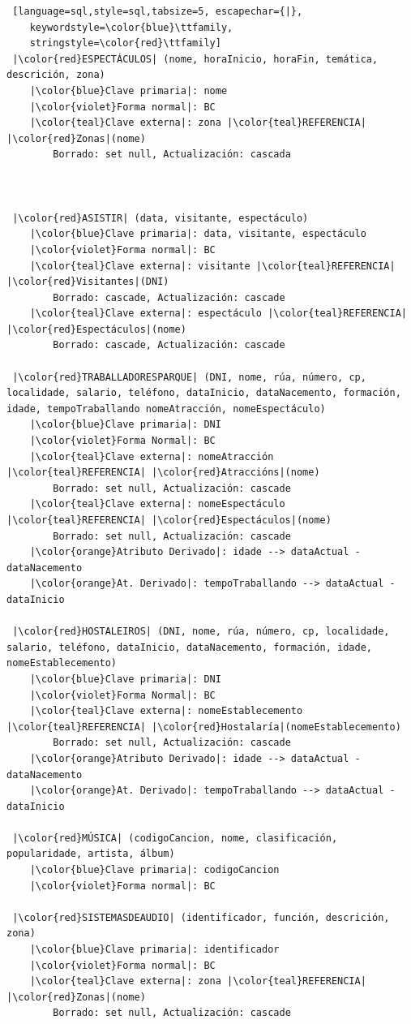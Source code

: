 \documentclass[12pt,a4paper]{book}
\theoremstyle{definition}
\theoremstyle{break}
\begin{document}
\begin{lstlisting} [language=sql,style=sql,tabsize=5, escapechar={|},
	keywordstyle=\color{blue}\ttfamily,
	stringstyle=\color{red}\ttfamily]
 |\color{red}ESPECTÁCULOS| (nome, horaInicio, horaFin, temática, descrición, zona)
 	|\color{blue}Clave primaria|: nome
 	|\color{violet}Forma normal|: BC
 	|\color{teal}Clave externa|: zona |\color{teal}REFERENCIA| |\color{red}Zonas|(nome)
 		Borrado: set null, Actualización: cascada
 
 
 
 |\color{red}ASISTIR| (data, visitante, espectáculo)
 	|\color{blue}Clave primaria|: data, visitante, espectáculo
 	|\color{violet}Forma normal|: BC
 	|\color{teal}Clave externa|: visitante |\color{teal}REFERENCIA| |\color{red}Visitantes|(DNI)
 		Borrado: cascade, Actualización: cascade
 	|\color{teal}Clave externa|: espectáculo |\color{teal}REFERENCIA| |\color{red}Espectáculos|(nome)
 		Borrado: cascade, Actualización: cascade
 		
 |\color{red}TRABALLADORESPARQUE| (DNI, nome, rúa, número, cp, localidade, salario, teléfono, dataInicio, dataNacemento, formación, idade, tempoTraballando nomeAtracción, nomeEspectáculo)
 	|\color{blue}Clave primaria|: DNI
	|\color{violet}Forma Normal|: BC
 	|\color{teal}Clave externa|: nomeAtracción |\color{teal}REFERENCIA| |\color{red}Atraccións|(nome)
 		Borrado: set null, Actualización: cascade
 	|\color{teal}Clave externa|: nomeEspectáculo |\color{teal}REFERENCIA| |\color{red}Espectáculos|(nome)
 		Borrado: set null, Actualización: cascade
 	|\color{orange}Atributo Derivado|: idade --> dataActual - dataNacemento
 	|\color{orange}At. Derivado|: tempoTraballando --> dataActual - dataInicio
 
 |\color{red}HOSTALEIROS| (DNI, nome, rúa, número, cp, localidade, salario, teléfono, dataInicio, dataNacemento, formación, idade, nomeEstablecemento)
 	|\color{blue}Clave primaria|: DNI
 	|\color{violet}Forma Normal|: BC
 	|\color{teal}Clave externa|: nomeEstablecemento |\color{teal}REFERENCIA| |\color{red}Hostalaría|(nomeEstablecemento)
 		Borrado: set null, Actualización: cascade
 	|\color{orange}Atributo Derivado|: idade --> dataActual - dataNacemento
 	|\color{orange}At. Derivado|: tempoTraballando --> dataActual - dataInicio
 	
 |\color{red}MÚSICA| (codigoCancion, nome, clasificación, popularidade, artista, álbum)
 	|\color{blue}Clave primaria|: codigoCancion
 	|\color{violet}Forma normal|: BC
 
 |\color{red}SISTEMASDEAUDIO| (identificador, función, descrición, zona)
 	|\color{blue}Clave primaria|: identificador
 	|\color{violet}Forma normal|: BC
 	|\color{teal}Clave externa|: zona |\color{teal}REFERENCIA| |\color{red}Zonas|(nome)
 		Borrado: set null, Actualización: cascade
 		

\end{lstlisting}
\end{document}

